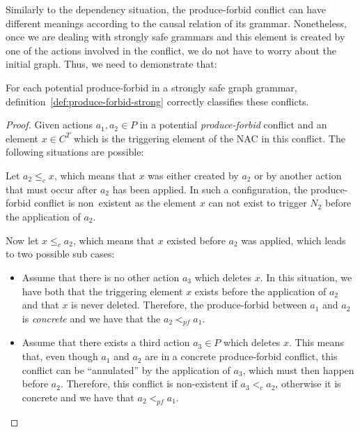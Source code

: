   Similarly to the dependency situation, the produce-forbid conflict can have different meanings according to the causal relation of its grammar. Nonetheless, once we are dealing with strongly safe grammars and this element is created by one of the actions involved in the conflict, we do not have to worry about the initial graph. Thus, we need to demonstrate that:

\begin{thm}  For each potential produce-forbid in a strongly safe graph grammar, definition~\ref{def:produce-forbid-strong} correctly classifies these conflicts.
\end{thm}

\begin{proof} Given actions $a_1,a_2 \in P$ in a potential \emph{produce-forbid} conflict and an element $x \in C^T$ which is the triggering element of the NAC in this conflict. The following situations are possible:
\hfill

\begin{description}[style=nextline,leftmargin=*]
  \item[Triggering element is related to the action:]
    Let $a_2 \leq_c x$, which means that $x$ was  either created by $a_2$ or by another action that must occur after $a_2$ has been applied. In such a configuration, the produce-forbid conflict is \mbox{non existent} as the element $x$ can not exist to trigger $N_2$ before the application of $a_2$.

    Now let $x \leq_c a_2$, which means that $x$ existed before $a_2$ was applied, which leads to two possible sub cases:

    \begin{itemize}
      \item Assume that there is no other action $a_3$ which deletes $x$. In this situation, we have both that the triggering element $x$ exists before the application of $a_2$ and that $x$ is never deleted. Therefore, the produce-forbid between $a_1$ and $a_2$ is \emph{concrete} and we have that the $a_2 <_{pf} a_1$.
      \item Assume that there exists a third action $a_3 \in P$ which deletes $x$. This means that, even though $a_1$ and $a_2$ are in a concrete produce-forbid conflict, this conflict can be ``annulated'' by the application of $a_3$, which must then happen before $a_2$. Therefore, this conflict is non-existent if $a_3 <_c a_2$, otherwise it is concrete and we have that $a_2 <_{pf} a_1$.
    \end{itemize}


\end{description}
\end{proof}
